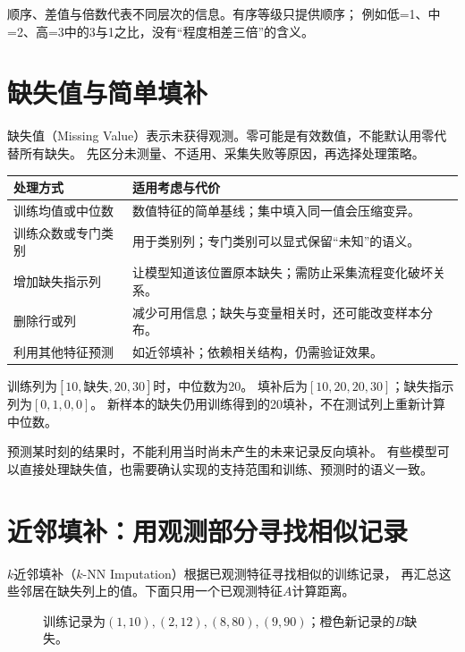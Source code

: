 顺序、差值与倍数代表不同层次的信息。有序等级只提供顺序；
例如低=1、中=2、高=3中的3与1之比，没有“程度相差三倍”的含义。

\section{缺失值与简单填补}
\label{sec:data-missing}
缺失值（Missing Value）表示未获得观测。零可能是有效数值，不能默认用零代替所有缺失。
先区分未测量、不适用、采集失败等原因，再选择处理策略。

\begin{center}
\begin{tabularx}{\textwidth}{P{32mm}Y}
\toprule
处理方式 & 适用考虑与代价\\
\midrule
训练均值或中位数 & 数值特征的简单基线；集中填入同一值会压缩变异。\\
训练众数或专门类别 & 用于类别列；专门类别可以显式保留“未知”的语义。\\
增加缺失指示列 & 让模型知道该位置原本缺失；需防止采集流程变化破坏关系。\\
删除行或列 & 减少可用信息；缺失与变量相关时，还可能改变样本分布。\\
利用其他特征预测 & 如近邻填补；依赖相关结构，仍需验证效果。\\
\bottomrule
\end{tabularx}
\end{center}

训练列为$[10,\text{缺失},20,30]$时，中位数为20。
填补后为$[10,20,20,30]$；缺失指示列为$[0,1,0,0]$。
新样本的缺失仍用训练得到的20填补，不在测试列上重新计算中位数。

\begin{pitfall}[时间顺序也约束填补]
预测某时刻的结果时，不能利用当时尚未产生的未来记录反向填补。
有些模型可以直接处理缺失值，也需要确认实现的支持范围和训练、预测时的语义一致。
\end{pitfall}

\section{近邻填补：用观测部分寻找相似记录}
\label{sec:data-knn}
$k$近邻填补（$k$-NN Imputation）根据已观测特征寻找相似的训练记录，
再汇总这些邻居在缺失列上的值。下面只用一个已观测特征$A$计算距离。

\begin{figure}[htbp]
\centering
\caption{训练记录为$(1,10),(2,12),(8,80),(9,90)$；橙色新记录的$B$缺失。}
\par\smallskip
{}
\end{figure}

